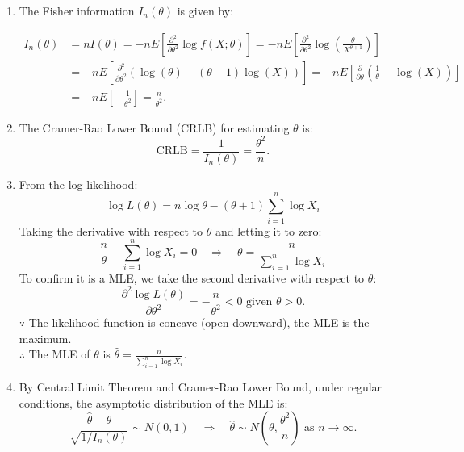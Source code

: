 \documentclass{article}
\begin{document}
\begin{enumerate}
\begin{enumerate}[label=(\roman*)]
    \item The Fisher information \( I_n(\theta) \) is given by:

    \begin{align*}
    I_n(\theta) &= nI(\theta) = -nE\left[ \frac{\partial^2}{\partial \theta^2} \log f(X; \theta) \right] = -nE\left[ \frac{\partial^2}{\partial \theta^2} \log \left( \frac{\theta}{X^{\theta + 1}} \right) \right] \\
    &= -nE\left[ \frac{\partial^2}{\partial \theta^2} (\log(\theta) - (\theta + 1) \log(X)) \right] = -nE\left[ \frac{\partial}{\partial \theta} \left( \frac{1}{\theta} - \log(X) \right) \right] \\
    &= -nE\left[ -\frac{1}{\theta^2} \right] = \frac{n}{\theta^2}.
    \end{align*}

    \item The Cramer-Rao Lower Bound (CRLB) for estimating \( \theta \) is:
    \[
    \text{CRLB} = \frac{1}{I_n(\theta)} = \frac{\theta^2}{n}.
    \]

    \item From the log-likelihood:
    \[
    \log L(\theta) = n \log \theta - (\theta + 1) \sum_{i=1}^n \log X_i
    \]
    Taking the derivative with respect to \( \theta \) and letting it to zero:
    \[
    \frac{n}{\theta} - \sum_{i=1}^n \log X_i = 0 \quad \Rightarrow \quad \theta = \frac{n}{\sum_{i=1}^n \log X_i}
    \]
    To confirm it is a MLE, we take the second derivative with respect to \( \theta \):
    \[
    \frac{\partial^2 \log L(\theta)}{\partial \theta^2} = -\frac{n}{\theta^2} < 0 \text{ given } \theta > 0.
    \]
    $\because$ The likelihood function is concave (open downward), the MLE is the maximum. \\
    $\therefore$ The MLE of \( \theta \) is $\hat{\theta} = \frac{n}{\sum_{i=1}^n \log X_i}$.

    \item
    By Central Limit Theorem and Cramer-Rao Lower Bound, under regular conditions, the asymptotic distribution of the MLE is:
    \[
    \frac{\hat{\theta} - \theta}{\sqrt{1/I_n(\theta)}} \sim N(0, 1) \quad \Rightarrow \quad \hat{\theta} \sim N\left( \theta, \frac{\theta^2}{n} \right) \text{ as } n \to \infty.
    \] 
    \end{enumerate}

\end{enumerate}
\end{document}
